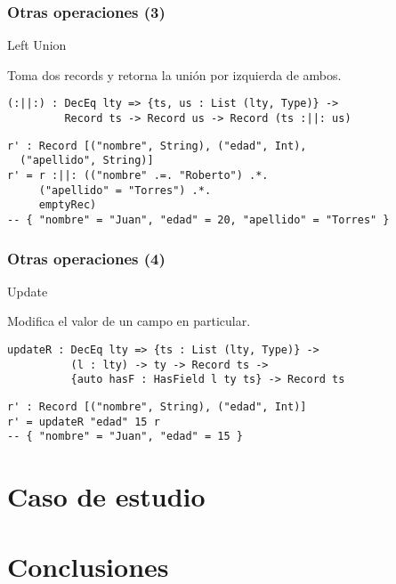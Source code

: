 \documentclass{beamer}
\begin{document}
\begin{frame}[fragile]
\frametitle{Otras operaciones (3)}

\begin{block}{Left Union}

Toma dos records y retorna la unión por izquierda de ambos.

\begin{example}
\begin{verbatim}
(:||:) : DecEq lty => {ts, us : List (lty, Type)} -> 
         Record ts -> Record us -> Record (ts :||: us)
\end{verbatim}
\end{example}

\begin{example}[Ejemplo]
\begin{verbatim}
r' : Record [("nombre", String), ("edad", Int), 
  ("apellido", String)]
r' = r :||: (("nombre" .=. "Roberto") .*. 
     ("apellido" = "Torres") .*. 
     emptyRec)
-- { "nombre" = "Juan", "edad" = 20, "apellido" = "Torres" }
\end{verbatim}
\end{example}

\end{block}
\end{frame}

\begin{frame}[fragile]
\frametitle{Otras operaciones (4)}

\begin{block}{Update}

Modifica el valor de un campo en particular.

\begin{example}
\begin{verbatim}
updateR : DecEq lty => {ts : List (lty, Type)} -> 
          (l : lty) -> ty -> Record ts -> 
          {auto hasF : HasField l ty ts} -> Record ts
\end{verbatim}
\end{example}

\begin{example}[Ejemplo]
\begin{verbatim}
r' : Record [("nombre", String), ("edad", Int)]
r' = updateR "edad" 15 r
-- { "nombre" = "Juan", "edad" = 15 }
\end{verbatim}
\end{example}

\end{block}

\end{frame}

\section{Caso de estudio}

\section{Conclusiones}
\end{document}
